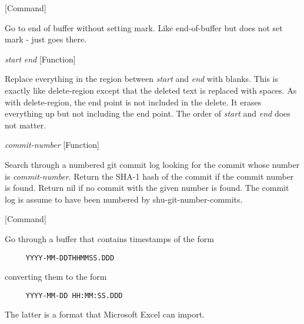 \vspace{1em}
\noindent
{}
\usebox{\funcname}
 \hfill [Command]

\begin{doc-string}
Go to end of buffer without setting mark.  Like end-of-buffer
but does not set mark - just goes there.
\end{doc-string}

\vspace{1em}
\noindent
{}
\usebox{\funcname}\emph{start} \emph{end}
 \hfill [Function]

\begin{doc-string}
Replace everything in the region between \emph{start} and \emph{end} with blanks.  This is
exactly like delete-region except that the deleted text is replaced with spaces.
As with delete-region, the end point is not included in the delete.  It erases
everything up but not including the end point.  The order of \emph{start} and \emph{end} does
not matter.
\end{doc-string}

\vspace{1em}
\noindent
{}
\usebox{\funcname}\emph{commit-number}
 \hfill [Function]

\begin{doc-string}
Search through a numbered git commit log looking for the commit whose number is
\emph{commit-number}.  Return the SHA-1 hash of the commit if the commit number is found.
Return nil if no commit with the given number is found.
The commit log is assume to have been numbered by shu-git-number-commits.
\end{doc-string}

\vspace{1em}
\noindent
{}
\usebox{\funcname}
 \hfill [Command]

\begin{doc-string}
Go through a buffer that contains timestamps of the form
\small{\begin{verbatim}
     YYYY-MM-DDTHHMMSS.DDD
\end{verbatim}}
converting them to the form
\small{\begin{verbatim}
     YYYY-MM-DD HH:MM:SS.DDD
\end{verbatim}}
The latter is a format that Microsoft Excel can import.
\end{doc-string}

